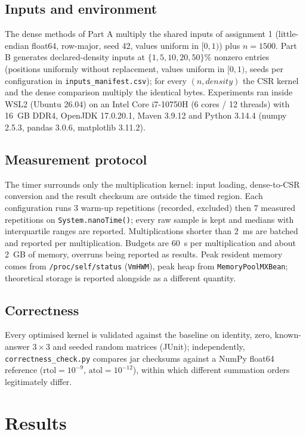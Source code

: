 \documentclass[11pt,a4paper]{article}
\begin{document}
\subsection{Inputs and environment}

The dense methods of Part A multiply the shared inputs of assignment 1
(little-endian float64, row-major, seed 42, values uniform in $[0,1)$) plus
$n = 1500$. Part B generates declared-density inputs at
$\{1, 5, 10, 20, 50\}\%$ nonzero entries (positions uniformly without
replacement, values uniform in $[0,1)$, seeds per configuration in
\texttt{inputs\_manifest.csv}); for every $(n, \textit{density})$ the CSR
kernel and the dense comparison multiply the identical bytes. Experiments
ran inside WSL2 (Ubuntu 26.04) on an Intel Core i7-10750H (6 cores /
12 threads) with 16~GB DDR4, OpenJDK 17.0.20.1, Maven 3.9.12 and Python
3.14.4 (numpy 2.5.3, pandas 3.0.6, matplotlib 3.11.2).

\subsection{Measurement protocol}

The timer surrounds only the multiplication kernel: input loading,
dense-to-CSR conversion and the result checksum are outside the timed
region. Each configuration runs 3 warm-up repetitions (recorded, excluded)
then 7 measured repetitions on \texttt{System.nanoTime()}; every raw sample
is kept and medians with interquartile ranges are reported. Multiplications
shorter than 2~ms are batched and reported per multiplication. Budgets are
60~s per multiplication and about 2~GB of memory, overruns being reported as
results. Peak resident memory comes from \texttt{/proc/self/status}
(\texttt{VmHWM}), peak heap from \texttt{MemoryPoolMXBean}; theoretical
storage is reported alongside as a different quantity.

\subsection{Correctness}

Every optimised kernel is validated against the baseline on identity, zero,
known-answer $3 \times 3$ and seeded random matrices (JUnit);
independently, \texttt{correctness\_check.py} compares jar checksums
against a NumPy float64 reference ($\mathrm{rtol} = 10^{-9}$,
$\mathrm{atol} = 10^{-12}$), within which different summation orders
legitimately differ.

\section{Results}
\label{sec:results}
\end{document}
